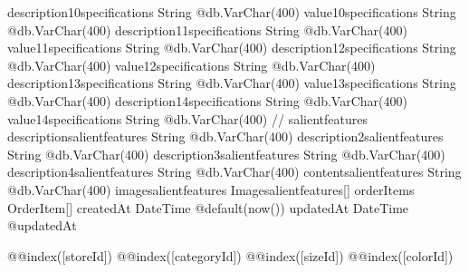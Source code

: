 {  description10specifications String                 @db.VarChar(400)
  value10specifications       String                 @db.VarChar(400)
  description11specifications String                 @db.VarChar(400)
  value11specifications       String                 @db.VarChar(400)
  description12specifications String                 @db.VarChar(400)
  value12specifications       String                 @db.VarChar(400)
  description13specifications String                 @db.VarChar(400)
  value13specifications       String                 @db.VarChar(400)
  description14specifications String                 @db.VarChar(400)
  value14specifications       String                 @db.VarChar(400)
  // salientfeatures
  descriptionsalientfeatures  String                 @db.VarChar(400)
  description2salientfeatures String                 @db.VarChar(400)
  description3salientfeatures String                 @db.VarChar(400)
  description4salientfeatures String                 @db.VarChar(400)
  contentsalientfeatures      String                 @db.VarChar(400)
  imagesalientfeatures        Imagesalientfeatures[]
  orderItems                  OrderItem[]
  createdAt                   DateTime               @default(now())
  updatedAt                   DateTime               @updatedAt

  @@index([storeId])
  @@index([categoryId])
  @@index([sizeId])
  @@index([colorId])
}

